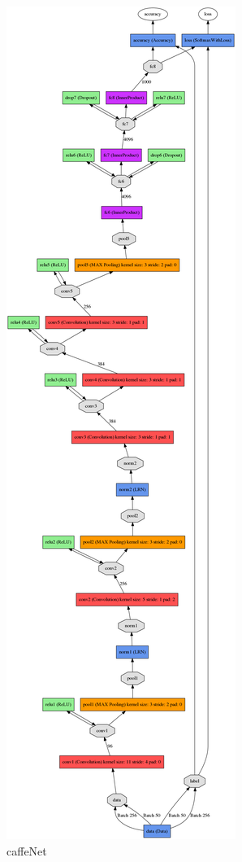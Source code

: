 \documentclass[a4paper,10pt]{jsarticle}
\begin{document}
\begin{figure}[p]
 \centering
 \includegraphics[scale=0.2]{fig/png/caffeNet.png}
  \caption{caffeNet}
  \label{204941_1Jul15}
\end{figure}
\end{document}
